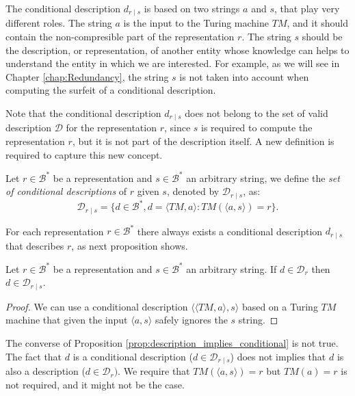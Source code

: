 The conditional description $d_{r \mid s}$ is based on two strings $a$ and $s$, that play very different roles. The string $a$ is the input to the Turing machine $TM$,  and it should contain the non-compresible part of the representation $r$. The string $s$ should be the description, or representation, of another entity whose knowledge can helps to understand the entity in which we are interested. For example, as we will see in Chapter \ref{chap:Redundancy}, the string $s$ is not taken into account when computing the surfeit of a conditional description.

Note that the conditional description $d_{r \mid s}$ does not belong to the set of valid description $\mathcal{D}$ for the representation $r$, since $s$ is required to compute the representation $r$, but it is not part of the description itself. A new definition is required to capture this new concept.

\begin{definition}
Let $r \in \mathcal{B}^\ast$ be a representation and $s \in \mathcal{B}^\ast$ an arbitrary string, we define the \emph{set of conditional descriptions} of $r$ given $s$, denoted by $\mathcal{D}_{r \mid s}$, as:
\[
\mathcal{D}_{r \mid s} = \{ d \in \mathcal{B}^\ast, d = \langle TM, a \rangle : TM \left(\langle a, s \rangle \right) = r \}.
\]
\end{definition}

For each representation $r \in \mathcal{B}^\ast$ there always exists a conditional description $d_{r \mid s}$ that describes $r$, as next proposition shows.

\begin{proposition}
\label{prop:description_implies_conditional}
Let $r \in \mathcal{B}^\ast$ be a representation and $s \in \mathcal{B}^\ast$ an arbitrary string. If $d \in \mathcal{D}_{r}$ then $d \in \mathcal{D}_{r \mid s}$.
\end{proposition}
\begin{proof}
We can use a conditional description $\langle \langle TM, a \rangle, s \rangle$ based on a Turing $TM$ machine that given the input $\langle a, s \rangle$ safely ignores the $s$ string.
\end{proof}

The converse of Proposition \ref{prop:description_implies_conditional} is not true. The fact that $d$ is a conditional description ($d \in \mathcal{D}_{r \mid s}$) does not implies that $d$ is also a description ($d \in \mathcal{D}_{r})$. We require that $TM \left(\langle a, s \rangle \right) = r$ but $TM \left( a \right) = r$ is not required, and it might not be the case.


